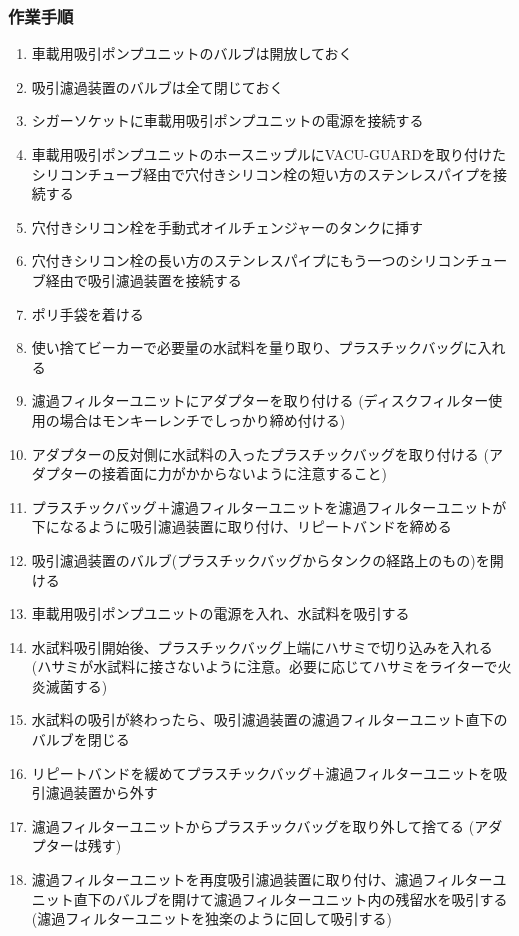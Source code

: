 \documentclass[titlepage,10pt,a4paper,uplatex]{jsbook}
\begin{document}
\subsubsection{作業手順}
\begin{enumerate}
\item 車載用吸引ポンプユニットのバルブは開放しておく
\item 吸引濾過装置のバルブは全て閉じておく
\item シガーソケットに車載用吸引ポンプユニットの電源を接続する
\item 車載用吸引ポンプユニットのホースニップルにVACU-GUARDを取り付けたシリコンチューブ経由で穴付きシリコン栓の短い方のステンレスパイプを接続する
\item 穴付きシリコン栓を手動式オイルチェンジャーのタンクに挿す
\item 穴付きシリコン栓の長い方のステンレスパイプにもう一つのシリコンチューブ経由で吸引濾過装置を接続する
\item ポリ手袋を着ける
\item 使い捨てビーカーで必要量の水試料を量り取り、プラスチックバッグに入れる
\item 濾過フィルターユニットにアダプターを取り付ける (ディスクフィルター使用の場合はモンキーレンチでしっかり締め付ける)
\item アダプターの反対側に水試料の入ったプラスチックバッグを取り付ける (アダプターの接着面に力がかからないように注意すること)
\item プラスチックバッグ＋濾過フィルターユニットを濾過フィルターユニットが下になるように吸引濾過装置に取り付け、リピートバンドを締める
\item 吸引濾過装置のバルブ(プラスチックバッグからタンクの経路上のもの)を開ける
\item 車載用吸引ポンプユニットの電源を入れ、水試料を吸引する
\item 水試料吸引開始後、プラスチックバッグ上端にハサミで切り込みを入れる (ハサミが水試料に接さないように注意。必要に応じてハサミをライターで火炎滅菌する)
\item 水試料の吸引が終わったら、吸引濾過装置の濾過フィルターユニット直下のバルブを閉じる
\item リピートバンドを緩めてプラスチックバッグ＋濾過フィルターユニットを吸引濾過装置から外す
\item 濾過フィルターユニットからプラスチックバッグを取り外して捨てる (アダプターは残す)
\item 濾過フィルターユニットを再度吸引濾過装置に取り付け、濾過フィルターユニット直下のバルブを開けて濾過フィルターユニット内の残留水を吸引する (濾過フィルターユニットを独楽のように回して吸引する)

\end{enumerate}
\end{document}
